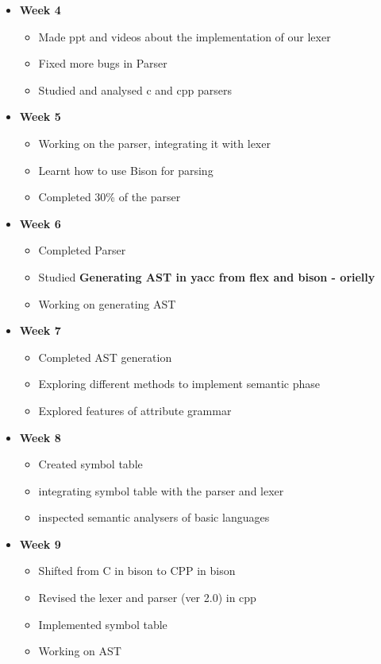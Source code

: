 \documentclass[english,a4paper,12pt]{report}
\begin{document}
\begin{itemize}
        \item \textbf{Week 4} \begin{itemize}
        \item  Made ppt and videos about the
        implementation of our lexer
        \item Fixed more bugs in Parser
        \item Studied and analysed c and cpp parsers 
    \end{itemize}
 
        \item \textbf{Week 5 }\begin{itemize}
        \item  Working on the parser, integrating it with  lexer
        \item Learnt how to use Bison for parsing
        \item Completed 30\% of the parser   
    \end{itemize}

        \item \textbf{Week 6} \begin{itemize}
        \item Completed Parser
        \item Studied \textbf{Generating AST in yacc from flex and bison - orielly}
        \item Working on generating AST        
    \end{itemize}

        \item\textbf{ Week 7 }\begin{itemize}
        \item Completed AST generation
        \item Exploring different methods to implement semantic phase
        \item  Explored features of attribute grammar
    \end{itemize}

        \item \textbf{Week 8} \begin{itemize}
        \item Created symbol table
        \item integrating symbol table with the parser and lexer
        \item  inspected semantic analysers of basic languages      
    \end{itemize}
    
        \item \textbf{Week 9 }\begin{itemize}
        \item Shifted from C in bison to CPP in bison
        \item Revised the lexer and parser (ver 2.0) in cpp 
        \item Implemented symbol table
        \item Working on AST
    \end{itemize}


\end{itemize}
\end{document}
